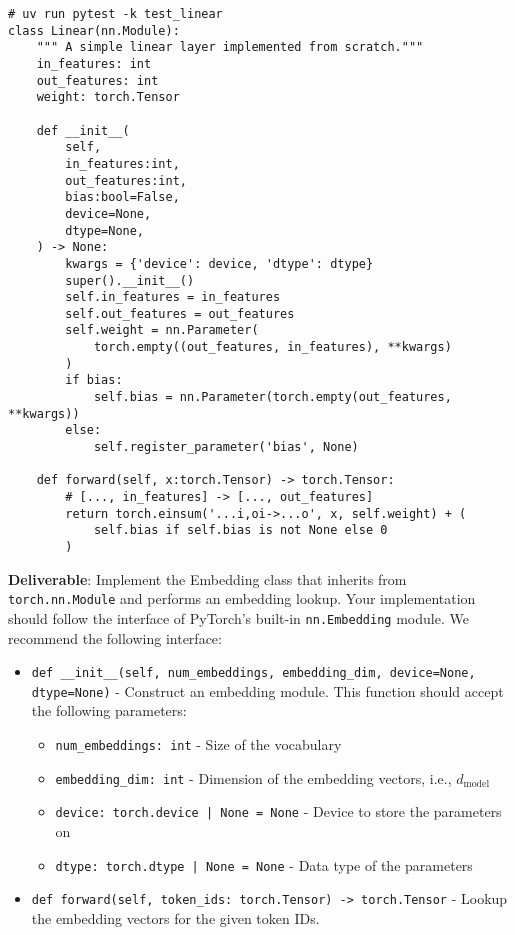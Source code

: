\begin{lstlisting}
# uv run pytest -k test_linear
class Linear(nn.Module):
    """ A simple linear layer implemented from scratch."""
    in_features: int
    out_features: int
    weight: torch.Tensor
    
    def __init__(
        self, 
        in_features:int, 
        out_features:int, 
        bias:bool=False,
        device=None, 
        dtype=None, 
    ) -> None:
        kwargs = {'device': device, 'dtype': dtype}
        super().__init__()
        self.in_features = in_features
        self.out_features = out_features
        self.weight = nn.Parameter(
            torch.empty((out_features, in_features), **kwargs)
        )
        if bias:
            self.bias = nn.Parameter(torch.empty(out_features, **kwargs))
        else:
            self.register_parameter('bias', None)
    
    def forward(self, x:torch.Tensor) -> torch.Tensor:
        # [..., in_features] -> [..., out_features]
        return torch.einsum('...i,oi->...o', x, self.weight) + (
            self.bias if self.bias is not None else 0
        )
\end{lstlisting}


\textbf{Deliverable}: Implement the Embedding class that inherits from \lstinline{torch.nn.Module} and performs an embedding lookup. Your implementation should follow the interface of PyTorch's built-in \lstinline{nn.Embedding} module. We recommend the following interface:

\begin{itemize}
    \item \lstinline{def __init__(self, num_embeddings, embedding_dim, device=None, dtype=None)} - Construct an embedding module. This function should accept the following parameters:
    \begin{itemize}
        \item \lstinline{num_embeddings: int} - Size of the vocabulary
        \item \lstinline{embedding_dim: int} - Dimension of the embedding vectors, i.e., $d_{\text{model}}$
        \item \lstinline{device: torch.device | None = None} - Device to store the parameters on
        \item \lstinline{dtype: torch.dtype | None = None} - Data type of the parameters
    \end{itemize}
    
    \item \lstinline{def forward(self, token_ids: torch.Tensor) -> torch.Tensor} - Lookup the embedding vectors for the given token IDs.
\end{itemize}

